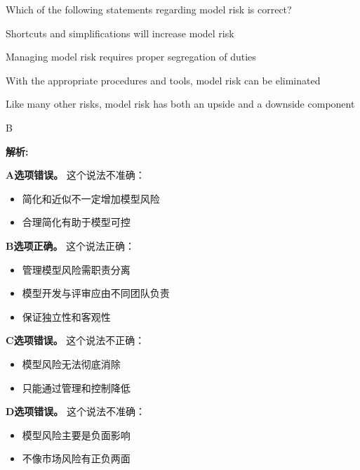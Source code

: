 \documentclass{article}
\newcounter{question} %
\newenvironment{explanation}
{\textbf{解析:}\par}
{\par}
\begin{document}
\begin{question}
    Which of the following statements regarding model risk is correct?
\end{question}

\begin{choices}
    \item Shortcuts and simplifications will increase model risk
    \item Managing model risk requires proper segregation of duties
    \item With the appropriate procedures and tools, model risk can be eliminated
    \item Like many other risks, model risk has both an upside and a downside component
\end{choices}

\begin{correctanswer}
    B
\end{correctanswer}

\begin{explanation}
    \textbf{A选项错误。}
    这个说法不准确：
    \begin{itemize}
        \item 简化和近似不一定增加模型风险
        \item 合理简化有助于模型可控
    \end{itemize}

    \textbf{B选项正确。}
    这个说法正确：
    \begin{itemize}
        \item 管理模型风险需职责分离
        \item 模型开发与评审应由不同团队负责
        \item 保证独立性和客观性
    \end{itemize}

    \textbf{C选项错误。}
    这个说法不正确：
    \begin{itemize}
        \item 模型风险无法彻底消除
        \item 只能通过管理和控制降低
    \end{itemize}

    \textbf{D选项错误。}
    这个说法不准确：
    \begin{itemize}
        \item 模型风险主要是负面影响
        \item 不像市场风险有正负两面
    \end{itemize}
\end{explanation}
\end{document}
